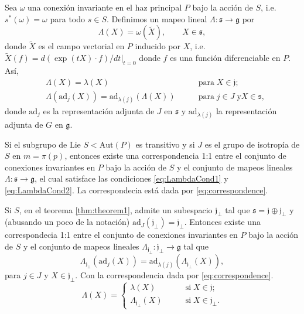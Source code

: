 \begin{pro}
Sea $\omega$ una conexi\'{o}n invariante en el haz principal $P$ bajo la acci\'{o}n de $S$, i.e. $s^{*}(\omega) = \omega$ para todo $s \in S$. Definimos un mapeo lineal $\Lambda: \mathfrak{s} \longrightarrow \mathfrak{g}$ por
%
\begin{equation}
\label{eq:correspondence}
\Lambda (X) = \omega (\tilde{X}), \qquad X \in \mathfrak{s},
\end{equation}
%
donde $\tilde{X}$ es el campo vectorial en $P$ inducido por $X$, i.e. $\tilde{X}(f) = d(\exp(t X) \cdot f)/dt \vert_{t=0}$ donde $f$ es una función diferenciable en $P$. As\'{i},
%
\begin{align}
\label{eq:LambdaCond1}
& \Lambda (X) = \lambda (X) & \mathrm{para} \; X\in \mathfrak{j}; \\
\label{eq:LambdaCond2}
& \Lambda (\mathrm{ad}_{j} (X)) = \mathrm{ad}_{\lambda (j)} (\Lambda (X)) \qquad & \mathrm{para} \; j \in J \; \mathrm{y} X \in \mathfrak{s},
\end{align}
%
donde $\mathrm{ad}_{j}$ es la representaci\'{o}n adjunta de $J$ en $\mathfrak{s}$ y $\mathrm{ad}_{\lambda (j)}$ la representaci\'{o}n adjunta de $G$ en $\mathfrak{g}$.
\end{pro}

\begin{thm}
\label{thm:theorem1}
Si el subgrupo de Lie $S < \mathrm{Aut} (P)$ es transitivo y si $J$ es el grupo de isotrop\'{i}a de $S$ en $m = \pi(p)$, entonces existe una correspondencia 1:1 entre el conjunto de conexiones invariantes en $P$ bajo la acci\'{o}n de $S$ y el conjunto de mapeos lineales $\Lambda: \mathfrak{s} \longrightarrow \mathfrak{g}$, el cual satisface las condiciones \eqref{eq:LambdaCond1} y \eqref{eq:LambdaCond2}. La correspondecia est\'{a} dada por \eqref{eq:correspondence}.
\end{thm}

\begin{thm}
Si $S$, en el teorema \ref{thm:theorem1}, admite un subespacio $\mathfrak{j}_{\perp}$ tal que $\mathfrak{s} = \mathfrak{j} \oplus \mathfrak{j}_{\perp}$ y (abusando un poco de la notaci\'{o}n) $\mathrm{ad}_{J} (\mathfrak{j}_{\perp}) = \mathfrak{j}_{\perp}$. Entonces existe una correspondecia 1:1 entre el conjunto de conexiones invariantes en $P$ bajo la acci\'{o}n de $S$ y el conjunto de mapeos lineales $\Lambda_{\mathfrak{j}_{\perp}}: \mathfrak{j}_{\perp} \longrightarrow \mathfrak{g}$ tal que
%
\begin{equation}
\label{eq:HiggsField}
\Lambda_{\mathfrak{j}_{\perp}} (\mathrm{ad}_{j} (X)) = \mathrm{ad}_{\lambda (j)} (\Lambda_{\mathfrak{j}_{\perp}} (X)),
\end{equation}
%
para $j \in J$ y $X \in \mathfrak{j}_{\perp}$. Con la correspondencia dada por \eqref{eq:correspondence}.
%
$$
\Lambda (X) = 
\begin{cases}
\lambda (X) \qquad & \mathrm{si} \; X\in \mathfrak{j}; \\
\Lambda_{\mathfrak{j}_{\perp}} (X) \qquad & \mathrm{si} \; X \in \mathfrak{j}_{\perp}.
\end{cases}
$$
%
\end{thm}

